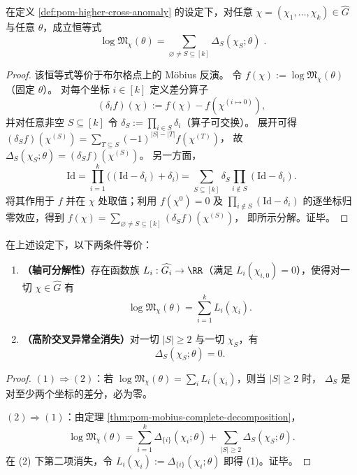 \begin{theorem}\label{thm:pom-mobius-complete-decomposition}
在定义 \ref{def:pom-higher-cross-anomaly} 的设定下，对任意 \(\chi=(\chi_1,\dots,\chi_k)\in\widehat G\) 与任意 \(\theta\)，成立恒等式
\[
\boxed{\;
\log\mathfrak{M}_\chi(\theta)
=\sum_{\varnothing\neq S\subseteq[k]}\Delta_S(\chi_S;\theta)\; }.
\]
\end{theorem}
\begin{proof}
该恒等式等价于布尔格点上的 Möbius 反演。
令 \(f(\chi):=\log\mathfrak{M}_\chi(\theta)\)（固定 \(\theta\)）。
对每个坐标 \(i\in[k]\) 定义差分算子
\[
(\delta_i f)(\chi):=f(\chi)-f(\chi^{(i\mapsto 0)}),
\]
并对任意非空 \(S\subseteq[k]\) 令 \(\delta_S:=\prod_{i\in S}\delta_i\)（算子可交换）。
展开可得
\(
(\delta_S f)(\chi^{(S)})=\sum_{T\subseteq S}(-1)^{|S|-|T|}f(\chi^{(T)})
\)，
故 \(\Delta_S(\chi_S;\theta)=(\delta_S f)(\chi^{(S)})\)。
另一方面，
\[
\mathrm{Id}=\prod_{i=1}^k\bigl((\mathrm{Id}-\delta_i)+\delta_i\bigr)
=\sum_{S\subseteq[k]}\delta_S\prod_{i\notin S}(\mathrm{Id}-\delta_i).
\]
将其作用于 \(f\) 并在 \(\chi\) 处取值；利用 \(f(\chi^0)=0\) 及 \(\prod_{i\notin S}(\mathrm{Id}-\delta_i)\) 的逐坐标归零效应，得到
\(
f(\chi)=\sum_{\varnothing\neq S\subseteq[k]}(\delta_S f)(\chi^{(S)})
\)，
即所示分解。证毕。
\end{proof}

\begin{theorem}[轴可分解严格化的充要条件]\label{thm:pom-axis-decomposability-iff}
在上述设定下，以下两条件等价：
\begin{enumerate}
  \item \textbf{（轴可分解性）}存在函数族 \(L_i:\widehat{G_i}\to\RR\)（满足 \(L_i(\chi_{i,0})=0\)），使得对一切 \(\chi\in\widehat G\) 有
  \[
  \log\mathfrak{M}_{\chi}(\theta)=\sum_{i=1}^k L_i(\chi_i).
  \]
  \item \textbf{（高阶交叉异常全消失）}对一切 \(|S|\ge 2\) 与一切 \(\chi_S\)，有
  \[
  \Delta_S(\chi_S;\theta)=0.
  \]
\end{enumerate}
\end{theorem}
\begin{proof}
\((1)\Rightarrow(2)\)：若 \(\log\mathfrak{M}_\chi(\theta)=\sum_i L_i(\chi_i)\)，则当 \(|S|\ge 2\) 时，
\(\Delta_S\) 是对至少两个坐标的差分，必为零。
\par
\((2)\Rightarrow(1)\)：由定理 \ref{thm:pom-mobius-complete-decomposition}，
\[
\log\mathfrak{M}_\chi(\theta)=\sum_{i=1}^k\Delta_{\{i\}}(\chi_i;\theta)+\sum_{|S|\ge 2}\Delta_S(\chi_S;\theta).
\]
在 (2) 下第二项消失，令 \(L_i(\chi_i):=\Delta_{\{i\}}(\chi_i;\theta)\) 即得 (1)。证毕。
\end{proof}

